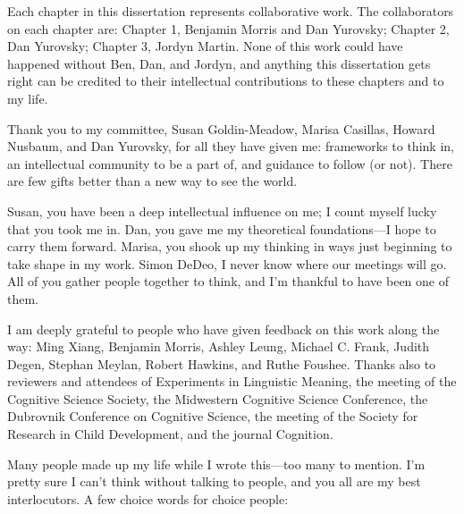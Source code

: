 \documentclass{ucetd}
\date{August 2023}
\title{\thesistitle}
\author{\thesisauthor}
\begin{document}
\maketitle

\makecopyright


\tableofcontents
{}
\newpage
{}
\listoffigures
\newpage
{}
\listoftables
\newpage

\acknowledgments
Each chapter in this dissertation represents collaborative work. The collaborators on each chapter are: Chapter 1, Benjamin Morris and Dan Yurovsky; Chapter 2, Dan Yurovsky; Chapter 3, Jordyn Martin. None of this work could have happened without Ben, Dan, and Jordyn, and anything this dissertation gets right can be credited to their intellectual contributions to these chapters and to my life.

Thank you to my committee, Susan Goldin-Meadow, Marisa Casillas, Howard Nusbaum, and Dan Yurovsky, for all they have given me: frameworks to think in, an intellectual community to be a part of, and guidance to follow (or not). There are few gifts better than a new way to see the world.

Susan, you have been a deep intellectual influence on me; I count myself lucky that you took me in. Dan, you gave me my theoretical foundations—I hope to carry them forward. Marisa, you shook up my thinking in ways just beginning to take shape in my work. Simon DeDeo, I never know where our meetings will go. All of you gather people together to think, and I'm thankful to have been one of them.

I am deeply grateful to people who have given feedback on this work along the way: Ming Xiang, Benjamin Morris, Ashley Leung, Michael C. Frank, Judith Degen, Stephan Meylan, Robert Hawkins, and Ruthe Foushee. Thanks also to reviewers and attendees of Experiments in Linguistic Meaning, the meeting of the Cognitive Science Society, the Midwestern Cognitive Science Conference, the Dubrovnik Conference on Cognitive Science, the meeting of the Society for Research in Child Development, and the journal Cognition.

Many people made up my life while I wrote this—too many to mention. I'm pretty sure I can't think without talking to people, and you all are my best interlocutors. A few choice words for choice people:
\end{document}

